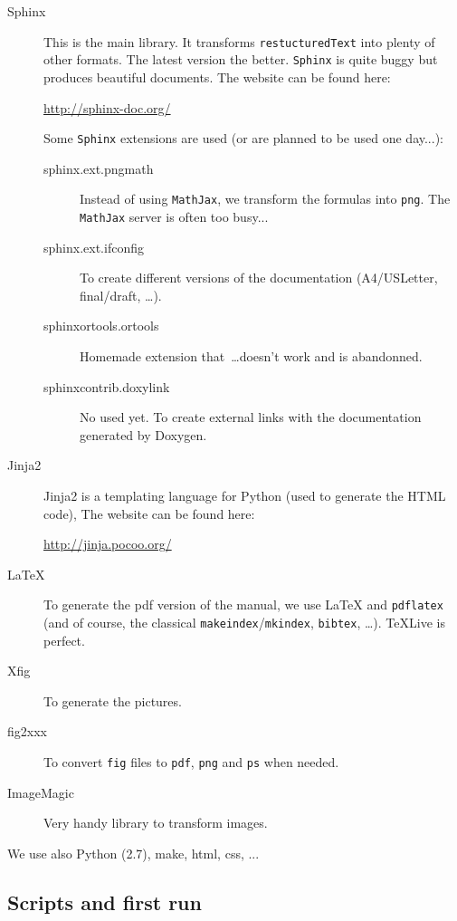 \documentclass[a4paper,10pt]{article}
\newcommand{\code}[1]{\texttt{#1}}
\begin{document}
\begin{description}
 \item[Sphinx] This is the main library. It transforms \verb+restucturedText+ into plenty of other formats. The latest version the better. \code{Sphinx} is quite buggy but produces beautiful documents. The website can be found here:

\href{http://sphinx-doc.org/}{http://sphinx-doc.org/}

Some \code{Sphinx} extensions are used (or are planned to be used one day...):
 \begin{description}
\item[sphinx.ext.pngmath] Instead of using \code{MathJax}, we transform the formulas into \code{png}. The \code{MathJax} server is often too busy...
\item[sphinx.ext.ifconfig] To create different versions of the documentation (A4/USLetter, final/draft, \ldots).
\item[sphinxortools.ortools] Homemade extension that~\ldots doesn't work and is abandonned.
\item[sphinxcontrib.doxylink] No used yet. To create external links with the documentation generated by Doxygen.
\end{description}

\item[Jinja2] Jinja2 is a templating language for Python (used to generate the HTML code), The website can be found here:

\href{http://jinja.pocoo.org/}{http://jinja.pocoo.org/}

 \item[\LaTeX] To generate the pdf version of the manual, we use \LaTeX{} and \verb+pdflatex+ (and of course, the classical \verb+makeindex+/\verb+mkindex+, \verb+bibtex+, \ldots). \TeX Live is perfect.

\item[Xfig] To generate the pictures.

\item[fig2xxx] To convert \code{fig} files to \code{pdf}, \code{png} and \code{ps} when needed.

\item[ImageMagic] Very handy library to transform images.

 \end{description}

We use also Python (2.7), make, html, css, ...

\subsection{Scripts and first run}
\end{document}
